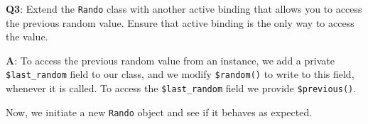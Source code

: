 \documentclass[
]{krantz}
\makeatletter
\newenvironment{Shaded}{\begin{snugshade}}{\end{snugshade}}
\newcommand{\CommentTok}[1]{\textcolor[rgb]{0.56,0.35,0.01}{\textit{#1}}}
\newcommand{\ControlFlowTok}[1]{\textcolor[rgb]{0.13,0.29,0.53}{\textbf{#1}}}
\newcommand{\DataTypeTok}[1]{\textcolor[rgb]{0.13,0.29,0.53}{#1}}
\newcommand{\DecValTok}[1]{\textcolor[rgb]{0.00,0.00,0.81}{#1}}
\newcommand{\KeywordTok}[1]{\textcolor[rgb]{0.13,0.29,0.53}{\textbf{#1}}}
\newcommand{\NormalTok}[1]{#1}
\newcommand{\OperatorTok}[1]{\textcolor[rgb]{0.81,0.36,0.00}{\textbf{#1}}}
\newcommand{\OtherTok}[1]{\textcolor[rgb]{0.56,0.35,0.01}{#1}}
\newcommand{\StringTok}[1]{\textcolor[rgb]{0.31,0.60,0.02}{#1}}
\newenvironment{kframe}{%
\medskip{}
\setlength{\fboxsep}{.8em}
 \def\at@end@of@kframe{}%
 \ifinner\ifhmode%
  \def\at@end@of@kframe{\end{minipage}}%
  \begin{minipage}{\columnwidth}%
 \fi\fi%
 \def\FrameCommand##1{\hskip\@totalleftmargin \hskip-\fboxsep
 \colorbox{shadecolor}{##1}\hskip-\fboxsep
     \hskip-\linewidth \hskip-\@totalleftmargin \hskip\columnwidth}%
 \MakeFramed {\advance\hsize-\width
   \@totalleftmargin\z@ \linewidth\hsize
   \@setminipage}}%
 {\par\unskip\endMakeFramed%
 \at@end@of@kframe}
\renewenvironment{Shaded}{\begin{kframe}}{\end{kframe}}
\renewcommand{\KeywordTok} [1]{\textcolor[rgb]{0.00,0.44,0.13}{{#1}}}
\renewcommand{\DataTypeTok}[1]{\textcolor[rgb]{0.56,0.13,0.00}{{#1}}}
\renewcommand{\DecValTok}  [1]{\textcolor[rgb]{0.25,0.63,0.44}{{#1}}}
\renewcommand{\StringTok}  [1]{\textcolor[rgb]{0.25,0.44,0.63}{{#1}}}
\renewcommand{\CommentTok} [1]{\textcolor[rgb]{0.38,0.63,0.69}{{#1}}}
\renewcommand{\OtherTok}   [1]{\textcolor[rgb]{0.00,0.44,0.13}{{#1}}}
\renewcommand{\NormalTok}  [1]{{#1}}
\makeatother
\begin{document}
\textbf{{Q3}}: Extend the \texttt{Rando} class with another active binding that allows you to access the previous random value. Ensure that active binding is the only way to access the value.

\textbf{{A}}: To access the previous random value from an instance, we add a private \texttt{\$last\_random} field to our class, and we modify \texttt{\$random()} to write to this field, whenever it is called. To access the \texttt{\$last\_random} field we provide \texttt{\$previous()}.

\begin{Shaded}
\end{Shaded}

Now, we initiate a new \texttt{Rando} object and see if it behaves as expected.

\begin{Shaded}
\end{Shaded}
\end{document}
